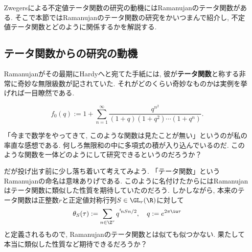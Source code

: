 \documentclass[11pt,b5paper,oneside,lualatex]{ltjsarticle} %
\numberwithin{equation}{section} %
\begin{document}
Zwegersによる不定値テータ関数の研究の動機にはRamanujanのテータ関数がある. 
そこで本節ではRamanujanのテータ関数の研究をかいつまんで紹介し, 不定値テータ関数とどのように関係するかを解説する. 


\subsection{テータ関数からの研究の動機} \label{subsec:mock}


Ramanujanがその最期にHardyへと宛てた手紙には, 彼が\textbf{テータ関数}と称する非常に奇妙な無限級数が記されていた. 
それがどのくらい奇妙なものかは実例を挙げれば一目瞭然である. 

\begin{dfn}
	\[
	f_0(q) :=
	1 + \sum_{n=1}^{\infty} \frac{q^{n^2}}{(1+q)(1+q^2) \cdots (1+q^n)}.
	\]
\end{dfn}

%

「今まで数学をやってきて, このような関数は見たことが無い」というのが私の率直な感想である. 
何しろ無限和の中に多項式の積が入り込んでいるのだ. 
このような関数を一体どのようにして研究できるというのだろうか？

だが投げ出す前に少し落ち着いて考えてみよう. 
「テータ関数」というRamanujanの命名は意味ありげである. 
このように名付けたからにはRamanujanはテータ関数に類似した性質を期待していたのだろう. 
しかしながら, 本来のテータ関数は正整数$ r $と正定値対称行列$ S \in \GL_r(\R) $に対して
\[
\theta_S (\tau) :=
\sum_{n \in \Z^r} q^{{}^t\!n S n/2}, \quad
q := e^{2\pi\iu\tau}
\]
と定義されるもので, Ramanujanのテータ関数とは似ても似つかない. 
果たして本当に類似した性質など期待できるだろうか？
\end{document}
